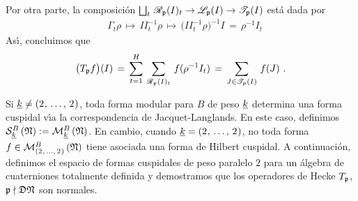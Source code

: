 Por otra parte, la composici\'{o}n
\begin{math}
	\bigsqcup_t\,\mathscr R_{\frak p}(I)_t\rightarrow
		\mathscr L_{\frak p}(I)\rightarrow\mathscr T_{\frak p}(I)
\end{math} est\'{a} dada por
\begin{align*}
	& \Gamma_t\rho\,\mapsto\, II_t^{-1}\rho\,\mapsto\,
		\big(II_t^{-1}\rho\big)^{-1}I\,=\,\rho^{-1}I_t
\end{align*}
%
As\'{\i}, concluimos que
\begin{equation}
	\label{eq:heckeparadefinidosconideales}
	\big(T_{\frak p}f\big)(I) \,=\,\sum_{t=1}^{H}\,
		\sum_{\mathscr R_{\frak p}(I)_t}\,f(\rho^{-1}I_t) \,=\,
		\sum_{J\in\mathscr T_{\frak p}(I)}\, f(J)
	\text{ .}
\end{equation}
%

Si $\peso{k}\not =(\lista[\null]{2}{\null})$, toda forma modular para $B$
de peso $\peso{k}$ determina una forma cuspidal v\'{\i}a la correspondencia de
Jacquet-Langlands. En este caso, definimos
$\spitzH[B]{k}{\frak{N}}:=\modularH[B]{k}{\frak{N}}$. En cambio, cuando
$\peso{k}=(\lista[\null]{2}{\null})$, no toda forma
$f\in\modular[B]{(\lista[\null]{2}{\null})}{\frak{N}}$ tiene asociada una forma
de Hilbert cuspidal. A continuaci\'{o}n, definimos el espacio de formas
cuspidales de peso paralelo $2$ para un \'{a}lgebra de cuaterniones totalmente
definida y demostramos que los operadores de Hecke $T_{\frak p}$,
$\frak p\nmid\frak D\frak N$ son normales.
% 
